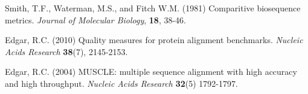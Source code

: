 \documentclass[phd,tocprelim]{cornell}
\begin{document}
\begin{thebibliography}{}
Smith, T.F., Waterman, M.S., and Fitch W.M. (1981) Comparitive biosequence metrics. \textit{Journal of Molecular Biology}, \textbf{18}, 38-46.

Edgar, R.C. (2010) Quality measures for protein alignment benchmarks. \textit{Nucleic Acids Research} \textbf{38}(7), 2145-2153.

Edgar, R.C. (2004) MUSCLE: multiple sequence alignment with high accuracy and high throughput. \textit{Nucleic Acids Research} \textbf{32}(5) 1792-1797.

\end{thebibliography}
\end{document}
